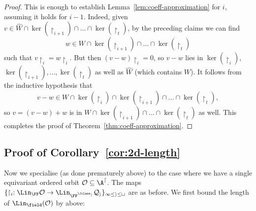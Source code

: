 \begin{proof}
This is enough to establish Lemma~\ref{lem:coeff-approximation} for $i$, assuming it holds for $i-1$.
Indeed, given $v \in \widehat W \cap \ker(\restriction_{i+1}) \cap \dots \cap \ker(\restriction_t)$, by the preceding claims
we can find \[
    w \in W \cap \ker(\restriction_{i+1}) \cap \dots \cap \ker(\restriction_t)
\] such that 
$v {\restriction_i} = w {\restriction_i}$.
But then $(v - w) {\restriction_{i}} = 0$, so $v - w$ lies in $\ker(\restriction_{i})$, $\ker(\restriction_{i+1}), \dots, \ker(\restriction_t)$ as well as $\widehat{W}$ (which contains $W$).
It follows from the inductive hypothesis that \[
    v - w \in W \cap \ker(\restriction_i) \cap \ker(\restriction_{i+1}) \cap \dots \cap \ker(\restriction_t),
\]
so $v = (v - w) + w$ is in $W \cap \ker(\restriction_{i+1}) \cap \dots \cap \ker(\restriction_t)$ as well.
This completes the proof of Theorem~\ref{thm:coeff-approximation}.
\end{proof}


\subsection{Proof of Corollary~\ref{cor:2d-length}}
Now we specialise (as done prematurely above) to the case where we have a single equivariant ordered orbit $\cal O \subseteq \A^d$.
The maps $\{\restriction_i : \Lin_\FF \cal O \to \Lin_{\FF^{\Jclass_i}} \cal Q_i\}_{1 \leq i \leq t}$ are as before.
We first bound the length of $\Lin_\field(\cal O)$ by above:

